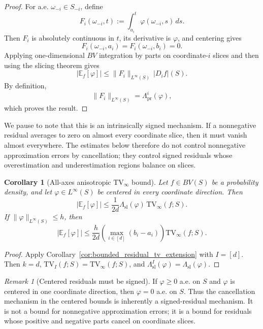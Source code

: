 \documentclass[11pt,letterpaper]{article}
\newtheorem{corollary}[theorem]{Corollary}
\theoremstyle{definition}
\theoremstyle{remark}
\newtheorem{remark}[theorem]{Remark}
\newcommand{\TV}{\mathrm{TV}}
\begin{document}
\begin{proof}
For a.e. $\omega_{-i}\in S_{-i}$, define
\[
F_i(\omega_{-i},t)
:=
\int_{a_i}^{t}\varphi(\omega_{-i},s)\,ds.
\]
Then $F_i$ is absolutely continuous in $t$, its derivative is
$\varphi$, and centering gives
\[
F_i(\omega_{-i},a_i)
=
F_i(\omega_{-i},b_i)
=
0.
\]
Applying one-dimensional $BV$ integration by parts on coordinate-$i$
slices and then using the slicing theorem gives
\[
|\mathbb E_f[\varphi]|
\le
\|F_i\|_{L^\infty(S)}\,|D_i f|(S).
\]
By definition,
\[
\|F_i\|_{L^\infty(S)}
=
\Lambda_{\mathrm{pr}}^i(\varphi),
\]
which proves the result.
\end{proof}
We pause to note that this is an intrinsically signed mechanism. If a
nonnegative residual averages to zero on almost every coordinate slice, then it
must vanish almost everywhere. The estimates below therefore do not control
nonnegative approximation errors by cancellation; they control signed residuals
whose overestimation and underestimation regions balance on slices.
\begin{corollary}[All-axes anisotropic $\TV_\infty$ bound]
\label{cor:all_axes_tv_bound}
Let $f\in BV(S)$ be a probability density, and let
$\varphi\in L^\infty(S)$ be centered in every coordinate direction. Then
\begin{equation}
\label{eq:all_axes_tv_bound}
|\mathbb E_f[\varphi]|
\le
\frac{1}{2d}\Lambda_{\mathrm{sl}}(\varphi)\,\TV_\infty(f;S).
\end{equation}
If $\|\varphi\|_{L^\infty(S)}\le h$, then
\begin{equation}
\label{eq:all_axes_tv_bound_sup}
|\mathbb E_f[\varphi]|
\le
\frac{h}{2d}
\left(\max_{i\in[d]}(b_i-a_i)\right)
\TV_\infty(f;S).
\end{equation}
\end{corollary}

\begin{proof}
Apply Corollary~\ref{cor:bounded_residual_tv_extension} with $I=[d]$.
Then $k=d$, $\TV_I(f;S)=\TV_\infty(f;S)$, and
$\Lambda_{\mathrm{sl}}^I(\varphi)=\Lambda_{\mathrm{sl}}(\varphi)$.
\end{proof}

\begin{remark}[Centered residuals must be signed]
\label{rem:positivity_centering_triviality}
If $\varphi\ge0$ a.e. on $S$ and $\varphi$ is centered in one coordinate
direction, then $\varphi=0$ a.e. on $S$. Thus the cancellation mechanism in
the centered bounds is inherently a signed-residual mechanism. It is not a
bound for nonnegative approximation errors; it is a bound for residuals whose
positive and negative parts cancel on coordinate slices.
\end{remark}
\end{document}
